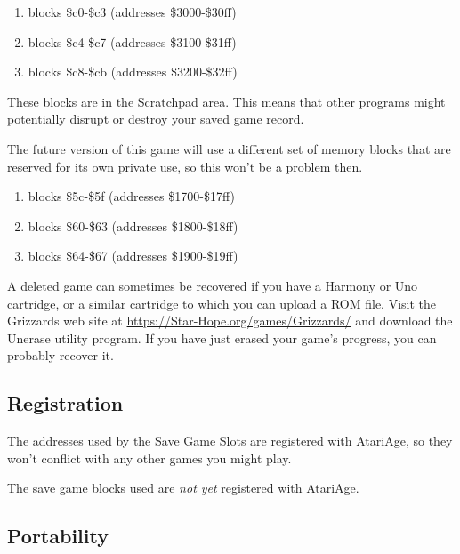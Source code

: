 \documentclass[10pt,twocolumn,openany,article]{memoir}
\begin{document}
\begin{description}
\ifdefined\DEMO

\begin{enumerate}
\item blocks \$c0-\$c3 (addresses \$3000-\$30ff)
\item blocks \$c4-\$c7 (addresses \$3100-\$31ff)
\item blocks \$c8-\$cb (addresses \$3200-\$32ff)
\end{enumerate}

These blocks are in the Scratchpad  area. This means that other programs
might potentially disrupt or destroy your saved game record.

The  future version  of this  game will  use a  different set  of memory
blocks  that are  reserved for  its own  private use,  so this  won't be
a problem then.

\else

\begin{enumerate}
\item blocks \$5c-\$5f (addresses \$1700-\$17ff)
\item blocks \$60-\$63 (addresses \$1800-\$18ff)
\item blocks \$64-\$67 (addresses \$1900-\$19ff)
\end{enumerate}

A deleted game can  sometimes be recovered if you have  a Harmony or Uno
cartridge, or a similar cartridge to which you can upload a ROM file.
Visit the Grizzards web site at
\href{https://Star-Hope.org/games/Grizzards/}{https://Star-Hope\-.org/\-games/\-Grizzards/}
and  download the Unerase utility  program. If you have  just erased
your game's progress, you can probably recover it.


\subsection{Registration}

\ifdefined\FIXMERegisterGameWithAtariAge

The addresses used by the Save  Game Slots are registered with AtariAge,
so they won't conflict with any other games you might play.

\else

The save game blocks used are \emph{not yet} registered with AtariAge.

\fi

\fi


\subsection{Portability}


\end{description}
\end{document}
